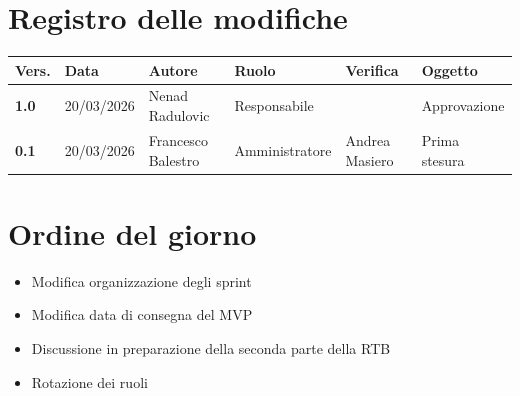 \documentclass[a4paper,12pt]{article}
\begin{document}
    

    \newpage
    \section*{Registro delle modifiche}

    \begin{table}[h!]
        \begin{tabularx}{\textwidth}{|l|l|l|l|X|X|}
            \hline
            \textbf{Vers.} & \textbf{Data} & \textbf{Autore} & \textbf{Ruolo} & \textbf{Verifica} & \textbf{Oggetto} \\
            \hline
            \textbf{1.0} & 20/03/2026 & Nenad Radulovic & Responsabile &  & Approvazione \\
            \hline
            \textbf{0.1} & 20/03/2026 & Francesco Balestro & Amministratore & Andrea Masiero & Prima stesura \\
            \hline
        \end{tabularx}
    \end{table}

    \newpage
    \tableofcontents
    \newpage

    \section{Ordine del giorno} {
        \begin{itemize}
            \item Modifica organizzazione degli sprint
            \item Modifica data di consegna del MVP
            \item Discussione in preparazione della seconda parte della RTB
            \item Rotazione dei ruoli
        \end{itemize}
    }
\end{document}
